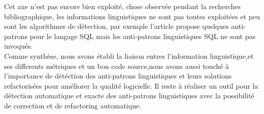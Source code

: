 Cet axe n’est pas encore bien exploité, chose observée pendant la recherches bibliographique, les informations linguistiques ne sont pas toutes exploitées et  peu sont les algorithmes de détection, par exemple l'article \cite{karwin2010sql} propose quelques anti-patrons pour le langage SQL mais les anti-patrons linguistiques SQL ne sont pas invoqués.
\\


\tab Comme synthèse, nous avons établi la liaison entres l’information linguistique,et ses differents métriques et un bon code source,nous avons aussi  touché à l’importance de détéction des anti-patrons linguistiques et leurs solutions refactorisées pour améliorer la qualité logicielle. Il  reste à réaliser un outil pour la détection automatique et exacte des anti-patrons linguistiques avec la possibilité de correction et de refactoring automatique.
